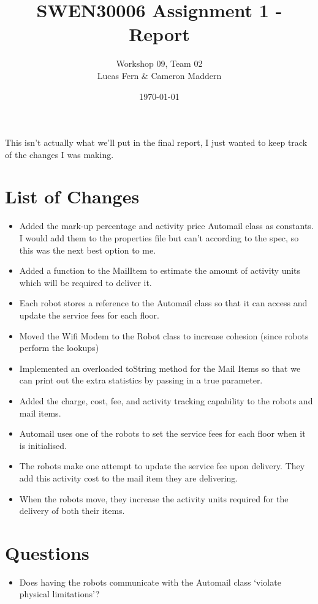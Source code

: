 \documentclass{article}
\title{SWEN30006 Assignment 1 - Report}
\date{\today}
\author{Workshop 09, Team 02\\Lucas Fern \& Cameron Maddern}
\begin{document}
\maketitle
\noindent This isn't actually what we'll put in the final report, I just wanted to keep track of the changes I was making.
\section{List of Changes}
\begin{itemize}
    \item Added the mark-up percentage and activity price Automail class as constants. I would add them to the properties file but can't according to the spec, so this was the next best option to me.
    \item Added a function to the MailItem to estimate the amount of activity units which will be required to deliver it.
    \item Each robot stores a reference to the Automail class so that it can access and update the service fees for each floor.
    \item Moved the Wifi Modem to the Robot class to increase cohesion (since robots perform the lookups)
    \item Implemented an overloaded toString method for the Mail Items so that we can print out the extra statistics by passing in a true parameter.
    \item Added the charge, cost, fee, and activity tracking capability to the robots and mail items.
    \item Automail uses one of the robots to set the service fees for each floor when it is initialised.
    \item The robots make one attempt to update the service fee upon delivery. They add this activity cost to the mail item they are delivering.
    \item When the robots move, they increase the activity units required for the delivery of both their items.
\end{itemize}
\section{Questions}
\begin{itemize}
    \item Does having the robots communicate with the Automail class `violate physical limitations'?
\end{itemize}
\end{document}
